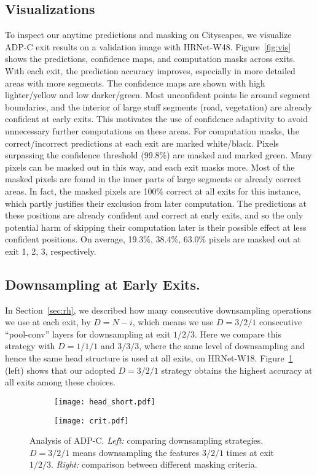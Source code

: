 \subsection{Visualizations} 
To inspect our anytime predictions and masking on Cityscapes, we visualize ADP-C exit results on a validation image with HRNet-W48.
Figure~\ref{fig:vis} shows the predictions, confidence maps, and computation masks across exits.
With each exit, the prediction accuracy improves, especially in more detailed areas with more segments.
The confidence maps are shown with high lighter/yellow and low darker/green.
Most unconfident points lie around segment boundaries, and the interior of large stuff segments (road, vegetation) are already confident at early exits.
This motivates the use of confidence adaptivity to avoid unnecessary further computations on these areas.
For computation masks, the correct/incorrect predictions at each exit are marked white/black.
Pixels surpassing the confidence threshold (99.8\%) are masked and marked green.
Many pixels can be masked out in this way, and each exit masks more.
Most of the masked pixels are found in the inner parts of large segments or already correct areas.
In fact, the masked pixels are 100\% correct at all exits for this instance, which partly justifies their exclusion from later computation.
The predictions at these positions are already confident and correct at early exits, and so the only potential harm of skipping their computation later is their possible effect at less confident positions.
On average, 19.3\%, 38.4\%, 63.0\% pixels are masked out at exit 1, 2, 3, respectively.



\subsection{Downsampling at Early Exits.}
In Section~\ref{sec:rh}, we described how many consecutive downsampling operations we use at each exit, by $D = N -i$, which means we use $D=3/2/1$ consecutive ``pool-conv'' layers for downsampling at exit $1/2/3$.
Here we compare this strategy with $D=1/1/1$ and $3/3/3$, where the same level of downsampling and hence the same head structure is used at all exits, on HRNet-W18. 
Figure~\ref{fig:twofigs} (left) shows that our adopted $D=3/2/1$ strategy obtains the highest accuracy at all exits among these choices.


\begin{figure}[!htbp]
\centering
   \begin{subfigure}{0.48\linewidth} \centering
     \texttt{[image: head\_short.pdf]}
   \end{subfigure}
   \begin{subfigure}{0.48\linewidth} \centering
     \texttt{[image: crit.pdf]}
   \end{subfigure}
\caption{Analysis of ADP-C. \emph{Left:} comparing downsampling strategies. $D=3/2/1$ means downsampling the features $3/2/1$ times at exit $1/2/3$. \emph{Right:} comparison between different masking criteria.} 
\label{fig:twofigs}
\end{figure}

